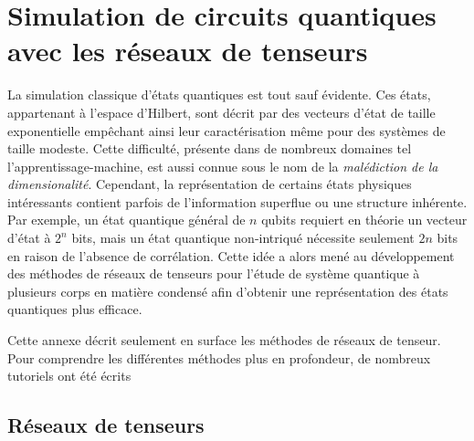 \begin{comment}
\end{comment}

\chapter{Simulation de circuits quantiques avec les réseaux de tenseurs}
\label{ann:simulation-circuits-quantiques-avec-reseaux-de-tenseurs}

La simulation classique d'états quantiques est tout sauf évidente. Ces états, appartenant à l'espace d'Hilbert, sont décrit par des vecteurs d'état de taille exponentielle empêchant ainsi leur caractérisation même pour des systèmes de taille modeste. Cette difficulté, présente dans de nombreux domaines tel l'apprentissage-machine, est aussi connue sous le nom de la \textit{malédiction de la dimensionalité}. Cependant, la représentation de certains états physiques intéressants contient parfois de l'information superflue ou une structure inhérente. Par exemple, un état quantique général de $n$ qubits requiert en théorie un vecteur d'état à $2^{n}$ bits, mais un état quantique non-intriqué nécessite seulement $2n$ bits en raison de l'absence de corrélation. Cette idée a alors mené au développement des méthodes de réseaux de tenseurs pour l'étude de système quantique à plusieurs corps en matière condensé afin d'obtenir une représentation des états quantiques plus efficace. 

Cette annexe décrit seulement en surface les méthodes de réseaux de tenseur. Pour comprendre les différentes méthodes plus en profondeur, de nombreux tutoriels ont été écrits~\cite{bridgemanHandwavingInterpretiveDance2017,biamonteTensorNetworksNutshell2017,bakerMethodesCalculAvec2021}


\section{Réseaux de tenseurs}



